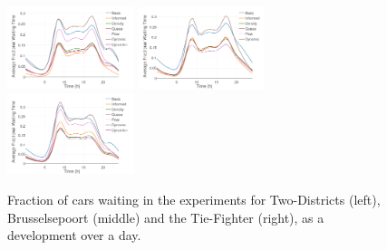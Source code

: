 \documentclass[11pt]{article}
\begin{document}
\begin{figure}[t]
	\includegraphics[width=0.33\textwidth]{img/frac_time_waiting_twodistr.png}
	\includegraphics[width=0.33\textwidth]{img/frac_time_waiting_maas.png}
	\includegraphics[width=0.33\textwidth]{img/frac_time_waiting_tie.png}
	\caption{Fraction of cars waiting in the experiments for Two-Districts (left), Brusselsepoort (middle) and the Tie-Fighter (right), as a development over a day. \label{fig:validation}}
\end{figure}
\end{document}
